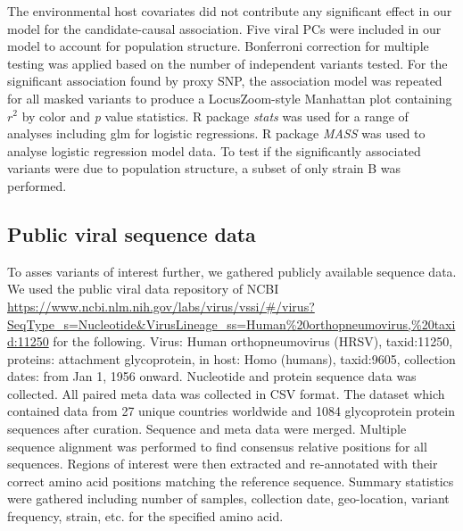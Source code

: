 \documentclass{article} %
\begin{document}
The environmental host covariates did not contribute any significant effect in our model for the candidate-causal association.
Five viral PCs were included in our model to account for population structure.
Bonferroni correction for multiple testing was applied based on the number of independent variants tested.
For the significant association found by proxy SNP, the association model was repeated for all masked variants to produce a LocusZoom-style Manhattan plot containing $r^2$ by color and \textit{p} value statistics.
R package \textit{stats} was used for a range of analyses including glm for logistic regressions. 
R package \textit{MASS} was used to analyse logistic regression model data.
To test if the significantly associated variants were due to population structure, 
a subset of only strain B was performed. 

\subsection{Public viral sequence data}
To asses variants of interest further, we gathered publicly available sequence data.
We used the public viral data repository of 
NCBI \url{https://www.ncbi.nlm.nih.gov/labs/virus/vssi/#/virus?SeqType_s=Nucleotide&VirusLineage_ss=Human\%20orthopneumovirus,\%20taxid:11250}
for the following.
Virus: Human orthopneumovirus (HRSV), taxid:11250, 
proteins: attachment glycoprotein,
in host: Homo (humans), taxid:9605,
collection dates: from Jan 1, 1956 onward.
Nucleotide and protein sequence data was collected.
All paired meta data was collected in CSV format.
The dataset which contained data from 27 unique countries worldwide and 1084 glycoprotein protein sequences after curation.
Sequence and meta data were merged.
Multiple sequence alignment was performed to find consensus relative positions for all sequences. 
Regions of interest were then extracted and re-annotated with their correct amino acid positions matching the reference sequence.
Summary statistics were gathered including number of samples, collection date, geo-location, variant frequency, strain, etc. for the specified amino acid.
\end{document}
